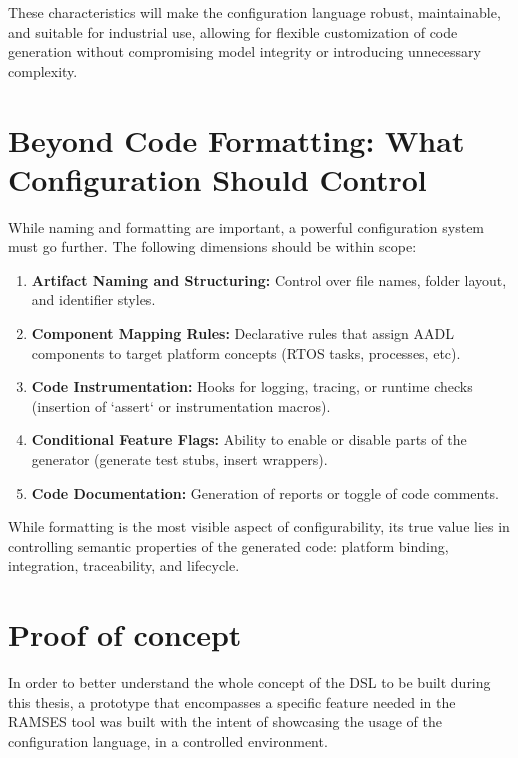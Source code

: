 These characteristics will make the configuration language robust, maintainable, and suitable for industrial use, allowing for flexible customization of code generation without compromising model integrity or introducing unnecessary complexity.

\section{Beyond Code Formatting: What Configuration Should Control}
\label{sec:config_scope}

While naming and formatting are important, a powerful configuration system must go further. The following dimensions should be within scope:

\begin{enumerate}
	\item \textbf{Artifact Naming and Structuring:} Control over file names, folder layout, and identifier styles.
	\item \textbf{Component Mapping Rules:} Declarative rules that assign \gls{AADL} components to target platform concepts (RTOS tasks, processes, etc).
	\item \textbf{Code Instrumentation:} Hooks for logging, tracing, or runtime checks (insertion of `assert` or instrumentation macros).
	\item \textbf{Conditional Feature Flags:} Ability to enable or disable parts of the generator (generate test stubs, insert wrappers).
	\item \textbf{Code Documentation:} Generation of reports or toggle of code comments.
\end{enumerate}

\begin{tcolorbox}[colback=blue!5, colframe=blue!50!black, title=Configuration is More Than Style]
	While formatting is the most visible aspect of configurability, its true value lies in controlling semantic properties of the generated code: platform binding, integration, traceability, and lifecycle.
\end{tcolorbox}

\section{Proof of concept}
\label{sec:proof_of_concept}

In order to better understand the whole concept of the \gls{DSL} to be built during this thesis, a prototype that encompasses a specific feature needed in the \gls{RAMSES} tool was built with the intent of showcasing the usage of the configuration language, in a controlled environment.

